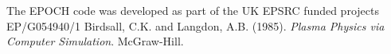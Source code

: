 \documentclass[]{article}
\begin{document}
{\def\section*#1{}
\begin{thebibliography}{1}
\setlength{\itemsep}{0pt}
The EPOCH code was developed as part of the UK EPSRC funded projects EP/G054940/1
Birdsall, C.K. and Langdon, A.B.  (1985). \textit{Plasma Physics via Computer Simulation}. McGraw-Hill.

\end{thebibliography}
}
\end{document}
